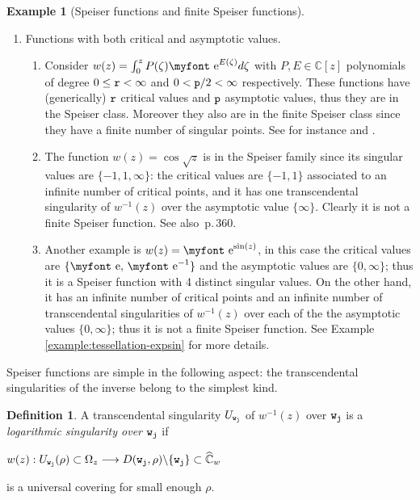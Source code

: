 \documentclass[final,3p,times]{elsarticle}
\makeatletter
\newcommand{\CC}{\ensuremath{{\mathbb C}}}
\newcommand{\CW}{\ensuremath{{\widehat{\mathbb C}}}}
\newcommand{\e}{{\text{\myfont e}}}
\newcommand*\bigcdot{\mathpalette\bigcdot@{.5}}
\newcommand*\bigcdot@[2]{\mathbin{\vcenter{\hbox{\scalebox{#2}{$\m@th#1\bullet$}}}}}
\theoremstyle{definition}
\newtheorem{definition}[theorem]{Definition}
\newtheorem{example}{Example}[section]
\makeatother
\begin{document}
\begin{example}[Speiser functions and finite Speiser functions]
\begin{enumerate}[label=\arabic*.,leftmargin=*]
\item 
Functions with both critical and asymptotic values. 
\begin{enumerate}[label=\alph*),leftmargin=*]
\item %
Consider $w(z)=\int_0^z P(\zeta) \e^{E(\zeta)} d\zeta$
with $P, E\in\CC[z]$ polynomials of degree $0\leq{\tt r}<\infty$ and 
$0< {\tt p} /2 < \infty$ 
respectively. 
These functions have (generically) ${\tt r}$ critical values and ${\tt p}$ asymptotic values,
thus they are in the Speiser class. Moreover they also are in the finite Speiser class since 
they have a finite number of singular points. 
See for instance \cite{AlvarezMucino2} and \cite{AlvarezMucino3}.

\item
The function $w(z)= \cos{\sqrt{z}}$ is in the Speiser family since its 
singular values are $\{ -1, 1, \infty \}$:
the critical values are $\{ -1,1 \}$ 
associated to an infinite number of critical points, and it has one transcendental singularity of 
$w^{-1}(z)$ over the asymptotic value $\{ \infty \}$. Clearly it is not a finite Speiser function.
See also \cite{GoldbergOstrovskii}\,p.\,360.

\item
Another example is $w(z)=\e^{\sin(z)}$, in this case the critical values are $\{ \e,\, \e^{-1} \}$ 
and the asymptotic values are $\{ 0, \infty \}$; 
thus it is a Speiser function with 4 distinct singular values. 
On the other hand, it has an infinite number of critical points and an
infinite number of transcendental singularities of $w^{-1}(z)$ 
over each of the the asymptotic values $\{ 0, \infty \}$; thus it is not a finite Speiser function.
See Example \ref{example:tessellation-expsin} for more details.
\end{enumerate}
\end{enumerate}
\end{example}

Speiser functions are simple in the following aspect:
the transcendental singularities of the inverse 
belong to the simplest kind.

\begin{definition}
\label{def:logaritmica}
A transcendental singularity $U_{{\tt w}_{\tt j}}$ of $w^{-1}(z)$ over ${\tt w}_{\tt j}$ is a
\emph{logarithmic singularity 
over ${\tt w}_{\tt j}$} if 

\centerline{
$w(z) : U_{{\tt w}_{\tt j}} (\rho) \subset \Omega_z \longrightarrow
D({{\tt w}_{\tt j}}, \rho) \backslash\{{\tt w}_{\tt j}\} \subset \CW_w$} 

\noindent 
is a universal covering for small enough
$\rho $. 
\end{definition}
\end{document}
